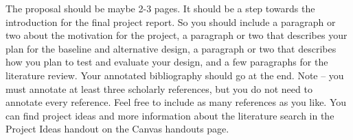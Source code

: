 \documentclass[10pt,letterpaper]{article}
\begin{document}
The proposal should be maybe 2-3 pages. It should be a step towards the
introduction for the final project report. So you should include a paragraph or
two about the motivation for the project, a paragraph or two that describes
your plan for the baseline and alternative design, a paragraph or two that
describes how you plan to test and evaluate your design, and a few paragraphs
for the literature review. Your annotated bibliography should go at the end.
Note -- you must annotate at least three scholarly references, but you do not
need to annotate every reference. Feel free to include as many references as
you like. You can find project ideas and more information about the literature
search in the Project Ideas handout on the Canvas handouts page.



\end{document}
